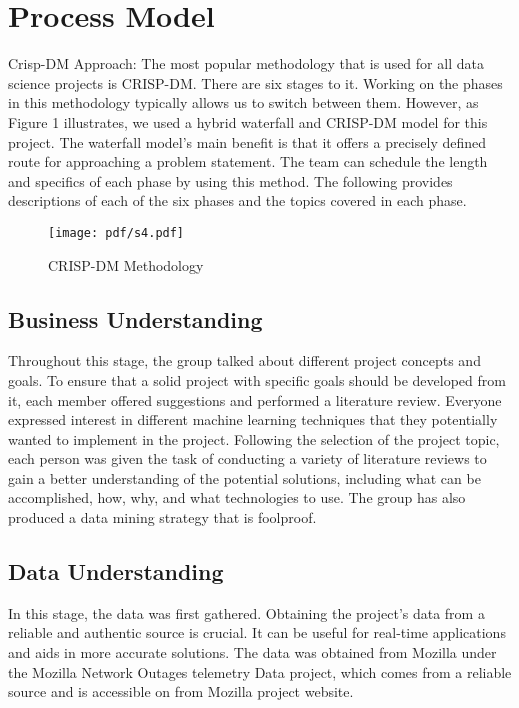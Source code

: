 \section{Process Model }
{Crisp-DM Approach}: The most popular methodology that is used for all data science projects is CRISP-DM. There are six stages to it. Working on the phases in this methodology typically allows us to switch between them. However, as Figure 1 illustrates, we used a hybrid waterfall and CRISP-DM model for this project. The waterfall model's main benefit is that it offers a precisely defined route for approaching a problem statement. The team can schedule the length and specifics of each phase by using this method. The following provides descriptions of each of the six phases and the topics covered in each phase.

\begin{figure}[ht!]
   \centering
  \texttt{[image: pdf/s4.pdf]}
  \vspace{-20pt}
  \caption{CRISP-DM Methodology}
\end{figure}
\subsection {Business Understanding}
\textbf{ }Throughout this stage, the group talked about different project concepts and goals. To ensure that a solid project with specific goals should be developed from it, each member offered suggestions and performed a literature review. Everyone expressed interest in different machine learning techniques that they potentially wanted to implement in the project. Following the selection of the project topic, each person was given the task of conducting a variety of literature reviews to gain a better understanding of the potential solutions, including what can be accomplished, how, why, and what technologies to use. The group has also produced a data mining strategy that is foolproof.

\subsection {Data Understanding}
In this stage, the data was first gathered. Obtaining the project's data from a reliable and authentic source is crucial. It can be useful for real-time applications and aids in more accurate solutions. The data was obtained from Mozilla under the Mozilla Network Outages telemetry Data project, which comes from a reliable source and is accessible on from Mozilla project website. 

